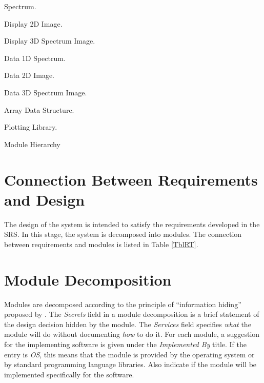 \documentclass[12pt, titlepage]{article}
\newcounter{mnum}
\newcommand{\mthemnum}{M\themnum}
\begin{document}
\begin{description}
Spectrum.
	\item [\refstepcounter{mnum} \mthemnum \label{m2Dimgdisplay}:] Display 2D
Image.
	\item [\refstepcounter{mnum} \mthemnum \label{m3DSIdisplay}:] Display 3D
Spectrum Image.
	\item [\refstepcounter{mnum} \mthemnum \label{m1Dspecdata}:] Data 1D Spectrum.
	\item [\refstepcounter{mnum} \mthemnum \label{m2Dimgdata}:] Data 2D Image.
	\item [\refstepcounter{mnum} \mthemnum \label{m3DSIdata}:] Data 3D Spectrum
Image.
	\item [\refstepcounter{mnum} \mthemnum \label{mArrayStruct}:] Array Data
Structure. 
	\item [\refstepcounter{mnum} \mthemnum \label{mPlotLib}:] Plotting Library.
\end{description}

\begin{table}[h!]
\centering

\caption{Module Hierarchy}
\label{TblMH}
\end{table}

\section{Connection Between Requirements and Design} \label{SecConnection}

The design of the system is intended to satisfy the requirements developed in
the SRS. In this stage, the system is decomposed into modules. The connection
between requirements and modules is listed in Table \ref{TblRT}.

\section{Module Decomposition} \label{SecMD}

Modules are decomposed according to the principle of ``information hiding''
proposed by \cite{parnas_modular_1985}. The \emph{Secrets} field in a module
decomposition is a brief statement of the design decision hidden by the
module. The \emph{Services} field specifies \emph{what} the module will do
without documenting \emph{how} to do it. For each module, a suggestion for the
implementing software is given under the \emph{Implemented By} title. If the
entry is \emph{OS}, this means that the module is provided by the operating
system or by standard programming language libraries.  Also indicate if the
module will be implemented specifically for the software.
\end{document}

